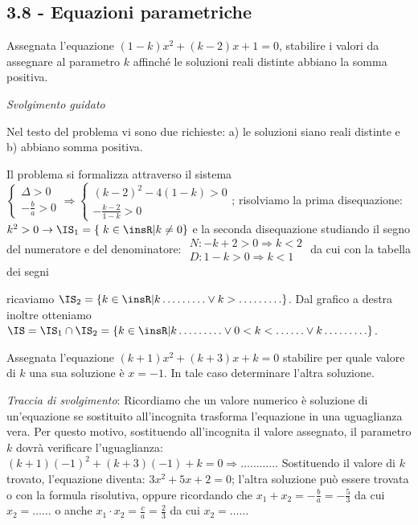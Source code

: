 \subsection*{3.8 - Equazioni parametriche}
\begin{esercizio}
 \label{ese:3.91}
Assegnata l’equazione $(1-k) x^{2} + (k-2) x + 1 = 0$, stabilire i valori da assegnare al parametro $k$ affinché le soluzioni reali distinte abbiano la somma positiva.

\emph{Svolgimento guidato}

Nel testo del problema vi sono due richieste: a) le soluzioni siano reali distinte e b) abbiano somma positiva.

Il problema si formalizza attraverso il sistema
$\left\{\begin{array}{l} \Delta > 0 \\- \frac{b}{a} > 0 \end{array}\right.
\Rightarrow \left \{\begin{array}{l} (k-2)^{2}-4 (1-k) > 0 \\-\frac{k-2}{1-k} > 0 \end{array}\right.$; risolviamo la prima disequazione: $k^{2} > 0 \rightarrow \IS_{1} = \left \{ \right .k \in \insR | k \neq 0 \}$ e la seconda disequazione studiando il segno del numeratore e del denominatore:
$\begin{array}{l} N: -k + 2 > 0 \Rightarrow k < 2 \\
D: 1-k > 0 \Rightarrow k < 1 \end{array}$ da cui con la tabella dei segni
\begin{center}

\end{center}
ricaviamo $\IS_{2} = \{k \in \insR | k \ldots \ldots \ldots \vee k > \ldots \ldots \ldots \}$.
Dal grafico a destra inoltre otteniamo $\IS = \IS_{1} \cap \IS_{2} = \{ k \in \insR | k
\ldots \ldots \ldots \vee 0 < k < \ldots \ldots \vee k \ldots \ldots \ldots \}$.
\end{esercizio}

\begin{esercizio}
 \label{ese:3.92}
Assegnata l’equazione $(k + 1) x^{2} + (k + 3) x + k = 0$ stabilire per quale valore di $k$ una sua soluzione è $x =-1$. In tale caso determinare l’altra soluzione.

\emph{Traccia di svolgimento}:
Ricordiamo che un valore numerico è soluzione di un'equazione se sostituito all’incognita trasforma l’equazione in una uguaglianza vera.
Per questo motivo, sostituendo all’incognita il valore assegnato, il parametro $k$ dovrà verificare l’uguaglianza: $(k + 1) (- 1)^{2} + (k + 3) (- 1) + k = 0 \Rightarrow\ldots\ldots\ldots\ldots$
Sostituendo il valore di $k$ trovato, l’equazione diventa: $3 x^{2} + 5 x + 2 = 0$; l’altra soluzione può essere trovata o con la formula risolutiva, oppure
ricordando che $x_{1} + x_{2}=- \frac{b}{a}=- \frac{5}{3}$ da cui $x_{2}=\ldots\ldots$ o anche $x_{1} \cdot x_{2}=\frac{c}{a}=\frac{2}{3}$ da cui $x_{2}=\ldots\ldots$
\end{esercizio}


